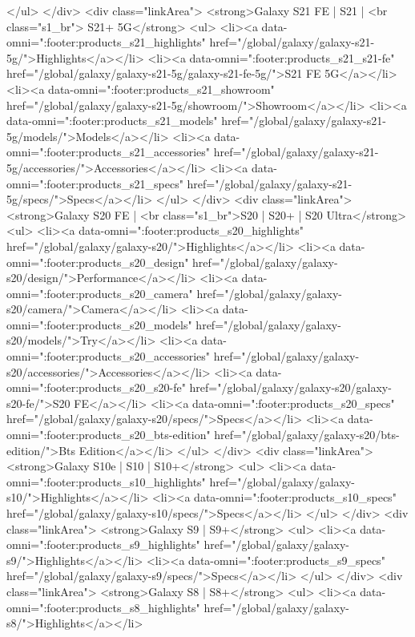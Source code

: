 {{{{{{{{{{{{{{{{{{{{{{{{{{{{{{{{{{{{{{{{{{{{{{{{{{{{{			</ul>
		</div>
		<div class="linkArea">
			<strong>Galaxy S21 FE | S21 | <br class="s1_br"> S21+ 5G</strong>
			<ul>
				<li><a data-omni=":footer:products_s21_highlights" href="/global/galaxy/galaxy-s21-5g/">Highlights</a></li>
				<li><a data-omni=":footer:products_s21_s21-fe" href="/global/galaxy/galaxy-s21-5g/galaxy-s21-fe-5g/">S21 FE 5G</a></li>
				<li><a data-omni=":footer:products_s21_showroom" href="/global/galaxy/galaxy-s21-5g/showroom/">Showroom</a></li>
				<li><a data-omni=":footer:products_s21_models" href="/global/galaxy/galaxy-s21-5g/models/">Models</a></li>
				<li><a data-omni=":footer:products_s21_accessories" href="/global/galaxy/galaxy-s21-5g/accessories/">Accessories</a></li>
				<li><a data-omni=":footer:products_s21_specs" href="/global/galaxy/galaxy-s21-5g/specs/">Specs</a></li>
			</ul>
		</div>
		<div class="linkArea">
			<strong>Galaxy S20 FE | <br class="s1_br">S20 | S20+ | S20 Ultra</strong>
			<ul>
				<li><a data-omni=":footer:products_s20_highlights" href="/global/galaxy/galaxy-s20/">Highlights</a></li>
				<li><a data-omni=":footer:products_s20_design" href="/global/galaxy/galaxy-s20/design/">Performance</a></li>
				<li><a data-omni=":footer:products_s20_camera" href="/global/galaxy/galaxy-s20/camera/">Camera</a></li>
				<li><a data-omni=":footer:products_s20_models" href="/global/galaxy/galaxy-s20/models/">Try</a></li>
				<li><a data-omni=":footer:products_s20_accessories" href="/global/galaxy/galaxy-s20/accessories/">Accessories</a></li>
				<li><a data-omni=":footer:products_s20_s20-fe" href="/global/galaxy/galaxy-s20/galaxy-s20-fe/">S20 FE</a></li>
				<li><a data-omni=":footer:products_s20_specs" href="/global/galaxy/galaxy-s20/specs/">Specs</a></li>
				<li><a data-omni=":footer:products_s20_bts-edition" href="/global/galaxy/galaxy-s20/bts-edition/">Bts Edition</a></li>
			</ul>
		</div>
		<div class="linkArea">
			<strong>Galaxy S10e | S10 | S10+</strong>
			<ul>
				<li><a data-omni=":footer:products_s10_highlights" href="/global/galaxy/galaxy-s10/">Highlights</a></li>
				<li><a data-omni=":footer:products_s10_specs" href="/global/galaxy/galaxy-s10/specs/">Specs</a></li>
			</ul>
		</div>
		<div class="linkArea">
			<strong>Galaxy S9 | S9+</strong>
			<ul>
				<li><a data-omni=":footer:products_s9_highlights" href="/global/galaxy/galaxy-s9/">Highlights</a></li>
				<li><a data-omni=":footer:products_s9_specs" href="/global/galaxy/galaxy-s9/specs/">Specs</a></li>
			</ul>
		</div>
		<div class="linkArea">
			<strong>Galaxy S8 | S8+</strong>
			<ul>
				<li><a data-omni=":footer:products_s8_highlights" href="/global/galaxy/galaxy-s8/">Highlights</a></li>
}}}}}}}}}}}}}}}}}}}}}}}}}}}}}}}}}}}}}}}}}}}}}}}}}}}}}
